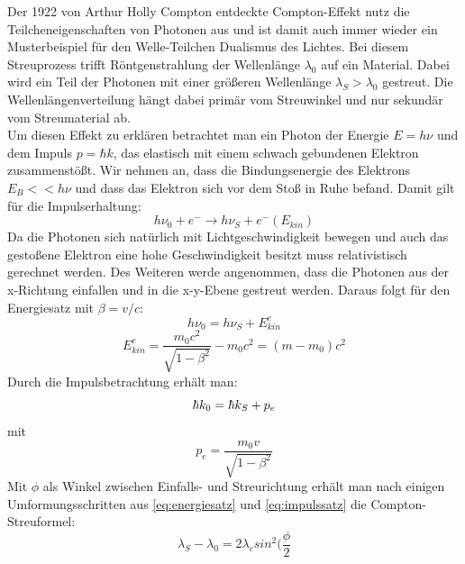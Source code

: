 \documentclass[.../bericht]{subfilies}
\begin{document}
      	Der 1922 von Arthur Holly Compton entdeckte Compton-Effekt nutz die Teilcheneigenschaften von Photonen aus und ist damit auch immer wieder ein Musterbeispiel für den Welle-Teilchen Dualismus des Lichtes. Bei diesem Streuprozess trifft Röntgenstrahlung der Wellenlänge $\lambda_0$ auf ein Material. Dabei wird ein Teil der Photonen mit einer größeren Wellenlänge $\lambda_S> \lambda_0$ gestreut. Die Wellenlängenverteilung hängt dabei primär vom Streuwinkel und nur sekundär vom Streumaterial ab. \\
        Um diesen Effekt zu erklären betrachtet man ein Photon der Energie $E=h\nu$ und dem Impuls $p=\hbar k$, das elastisch mit einem schwach gebundenen Elektron zusammenstößt. Wir nehmen an, dass die Bindungsenergie des Elektrons $E_B<<h\nu$ und dass das Elektron sich vor dem Stoß in Ruhe befand. Damit gilt für die Impulserhaltung:
        \begin{equation}
          h\nu_0+e^- \rightarrow h\nu_S+e^-(E_{kin})
          \label{eq:impulserhaltung}
        \end{equation}
        Da die Photonen sich natürlich mit Lichtgeschwindigkeit bewegen und auch das gestoßene Elektron eine hohe Geschwindigkeit besitzt muss relativistisch gerechnet werden. Des Weiteren werde angenommen, dass die Photonen aus der x-Richtung einfallen und in die x-y-Ebene gestreut werden. Daraus folgt für den Energiesatz mit $\beta=v/c$:
        \begin{equation}
          h\nu_0=h\nu_S+E^e_{kin}
          \label{eq:energiesatz}
        \end{equation}
        \begin{equation}
          E^e_{kin}=\frac{m_0c^2}{\sqrt{1-\beta^2}}-m_0c^2=(m-m_0)c^2
          \label{eq:energie}
        \end{equation}
        Durch die Impulsbetrachtung erhält man:
        \begin{equation}
          \hbar k_0=\hbar k_S +p_e \\
          \label{eq:impulssatz}
        \end{equation}
        mit
        \begin{equation}
          p_e=\frac{m_0 v}{\sqrt{1-\beta^2}}
          \label{eq:impuls}
        \end{equation}
        Mit $\phi$ als Winkel zwischen Einfalls- und Streurichtung erhält man nach einigen Umformungsschritten aus \cref{eq:energiesatz} und \cref{eq:impulssatz} die Compton-Streuformel:
        \begin{equation}
          \lambda_S-\lambda_0=2\lambda_csin^2(\frac{\phi}{2}
          \label{eq:streuformel}
        \end{equation}
\end{document}
